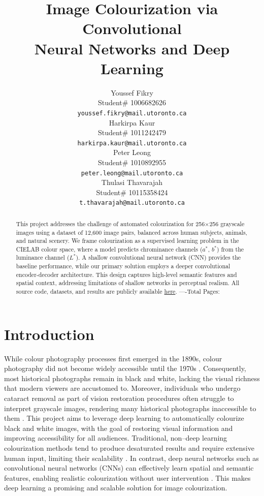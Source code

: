 \documentclass{article} %
\title{Image Colourization via Convolutional \\
Neural Networks and Deep Learning}
\author{Youssef Fikry  \\
Student\# 1006682626\\
\texttt{youssef.fikry@mail.utoronto.ca} \\
\And Harkirpa Kaur  \\
Student\# 1011242479 \\
\texttt{harkirpa.kaur@mail.utoronto.ca} \\
\AND
Peter Leong \\
Student\# 1010892955 \\
\texttt{peter.leong@mail.utoronto.ca} \\
\And
Thulasi Thavarajah \\
Student\# 10115358424 \\
\texttt{t.thavarajah@mail.utoronto.ca} \\
\AND
}
\begin{document}
\maketitle

\begin{abstract}
This project addresses the challenge of automated colourization for 256$\times$256 grayscale images using a dataset of 12,600 image pairs, balanced across human subjects, 
animals, and natural scenery. We frame colourization as a supervised learning problem in the CIELAB colour space, where a model predicts chrominance channels ($a^*$, $b^*$) 
from the luminance channel ($L^*$). A shallow convolutional neural network (CNN) provides the baseline performance, while our primary solution employs a deeper convolutional encoder-decoder architecture. This 
design captures high-level semantic features and spatial context, addressing limitations of shallow networks in perceptual realism. All source code, datasets, and results 
are publicly available \href{https://drive.google.com/drive/folders/1cV1NhlQ8UTk_CgJdwhqeRu0z5xE85ZsI?usp=sharing}{here}. 
----Total Pages: \pageref{last_page}
\end{abstract}


\section{Introduction}

While colour photography processes first emerged in the 1890s, colour photography did not become widely accessible until the 1970s \citep{scienceandmediamuseum2020}. Consequently, most historical photographs remain in black and white, lacking the visual richness that modern viewers are accustomed to. Moreover, individuals who undergo cataract removal as part of vision restoration procedures often struggle to interpret grayscale images, rendering many historical photographs inaccessible to them \citet{vogelsang2024impact}. This project aims to leverage deep learning to automatically colourize black and white images, with the goal of restoring visual information and improving accessibility for all audiences. Traditional, non–deep learning colourization methods tend to produce desaturated results and require extensive human input, limiting their scalability \citep{cheng2016deepcolorization}. In contrast, deep neural networks such as convolutional neural networks (CNNs) can effectively learn spatial and semantic features, enabling realistic colourization without user intervention \citep{zhang2016colorful}. This makes deep learning a promising and scalable solution for image colourization.
\end{document}
